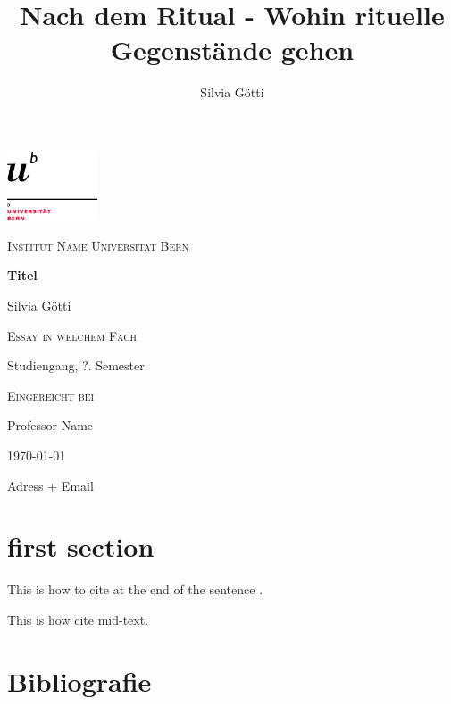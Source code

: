 \documentclass[12pt,a4paper]{article}
\title{Nach dem Ritual - Wohin rituelle Gegenstände gehen}
\author{Silvia Götti}
\begin{document}
\begin{titlepage}

\centering
	\includegraphics[width=0.2\textwidth]{logo_unibern@2x.png}
	\vfill
	{\scshape\LARGE Institut Name Universität Bern \par}
	\vspace{1cm}	
	{\huge\bfseries Titel\par}
	\vspace{2cm}
	{\Large Silvia Götti\par}	
	\vspace{1cm}
	{\scshape Essay in welchem Fach\par}
	{Studiengang, ?. Semester\par}
	\vspace{1.5cm}
	
	{\scshape Eingereicht bei\par}
	Professor Name

	
	{\today\par}
	\vfill
	Adress + Email


\end{titlepage}

\tableofcontents

\section{first section}

This is how to cite at the end of the sentence \citep[S.23]{richter_altsteinzeit_2018}.

This is how \citet{berg_weltkulturerbe_2018} cite mid-text.

\newpage

\section{Bibliografie}

%
\renewcommand{\harvardurl}[1]{\url{#1}}

\end{document}
